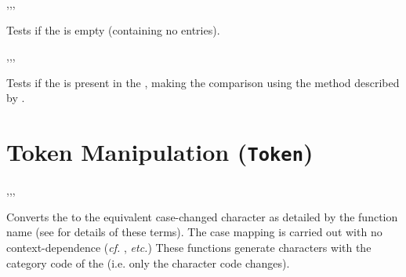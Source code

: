 \documentclass[oneside]{book}
\begin{document}
\begin{function}{\PropVarIfEmpty,\PropVarIfEmptyT,\PropVarIfEmptyF,\PropVarIfEmptyTF}
\begin{syntax}
 
  
  
   
\end{syntax}
Tests if the  is empty (containing no entries).
\begin{demohigh}
\PropSetFromKeyval {}
\PropVarIfEmptyTF {} {}
\PropClear \lTmpaProp
\PropVarIfEmptyTF {} {}
\end{demohigh}
\end{function}

\begin{function}{\PropVarIfIn,\PropVarIfInT,\PropVarIfInF,\PropVarIfInTF}
\begin{syntax}
  
   
   
    
\end{syntax}
Tests if the  is present in the ,
making the comparison using the method described by .
\begin{demohigh}
\PropSetFromKeyval {}
\PropVarIfInTF {} {} {}
\PropVarIfInTF {} {} {}
\end{demohigh}
\end{function}

\chapter{Token Manipulation (\texttt{Token})}

\begin{function}{\CharLowercase,\CharUppercase,\CharTitlecase,\CharFoldcase}
\begin{syntax}
 
 
 
 
\end{syntax}
Converts the  to the equivalent case-changed character
as detailed by the function name (see %
 for details of these terms). The case mapping
is carried out with no context-dependence (\emph{cf.} ,
\emph{etc.}) These functions generate characters with the category code
of the  (i.e. only the character code changes).
\end{function}
\end{document}
